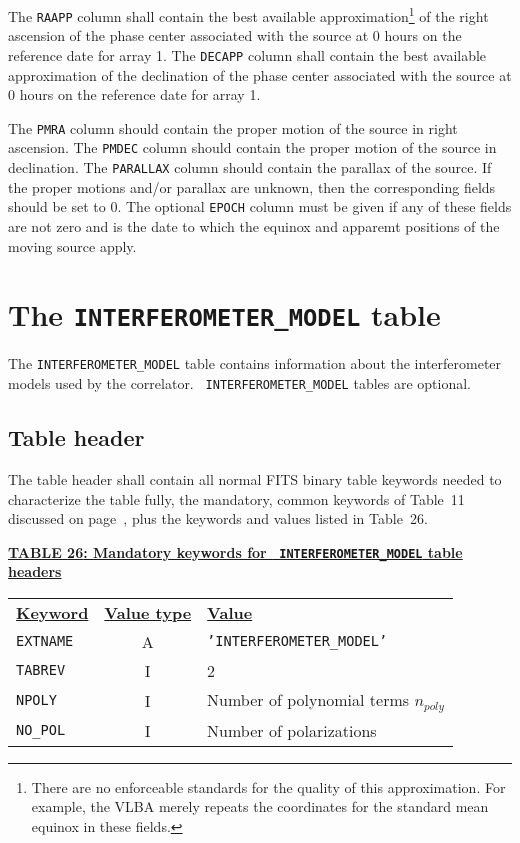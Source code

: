 \documentclass[twoside]{article}
\newcommand{\Hi}[1]{\textcolor{hicol}{#1}}
\newcommand{\Me}[1]{\textcolor{mecol}{#1}}
\newcommand{\npoly}{$n_{poly}$}
\begin{document}
The {\tt RAAPP} column shall contain the best available
approximation\footnote{There are no enforceable standards for the
  quality of this approximation.  For example, the VLBA merely repeats
  the coordinates for the standard mean \Hi{equinox} in these fields.}
of the right ascension of the phase center associated with the source
at 0 hours on the reference date for array 1.  The {\tt DECAPP} column
shall contain the best available approximation of the \Hi{declination}
of the phase center associated with the source at 0 hours on the
reference date for array 1.

The {\tt PMRA} column should contain the proper motion of the source
in right ascension.  The {\tt PMDEC} column should contain the proper
motion of the source in declination.  The {\tt PARALLAX} column should
contain the parallax of the source.  If the proper \Hi{motions and/or
parallax} are unknown, then \Hi{the corresponding} fields should be
set to 0.  \Me{The optional {\tt EPOCH} column must be given if any of
  these fields are not zero and is the date to which the equinox and
  apparemt positions of the moving source apply.}

\section{The {\tt INTERFEROMETER\_MODEL} table}
\label{s:IM}

The {\tt INTERFEROMETER\_MODEL} table contains information about the
interferometer models used by the correlator.  {\tt
  INTERFEROMETER\_MODEL} tables are optional.

\subsection{Table header}

\Hi{The table header shall contain all normal FITS binary table
keywords needed to characterize the table fully, the mandatory, common
keywords of Table~11 discussed on page~\pageref{ta:keywords}, plus the
keywords and values listed in Table~\Hi{26}.}

\begin{center}
\underline{\bf{TABLE \Hi{26}: Mandatory keywords for {\tt
    INTERFEROMETER\_MODEL} table headers}}\\
\begin{tabular}{lcl}
\noalign{\vspace{2pt}}
\underline{{\bf Keyword}} & \underline{\bf{Value type}} &
    \underline{\bf{Value\vphantom{y}}} \\
\noalign{\vspace{2pt}}
{\tt EXTNAME}   & A & {\tt 'INTERFEROMETER\_MODEL'}  \\
{\tt TABREV}    & I & 2 \\
{\tt NPOLY}     & I & Number of polynomial terms \npoly \\
{\tt NO\_POL}   & I & Number of polarizations
\end{tabular}
\end{center}
\end{document}
